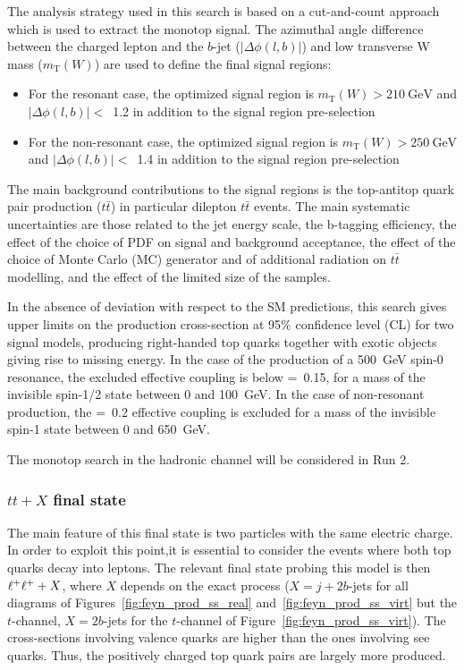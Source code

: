 The analysis strategy used in this search is based on a cut-and-count approach which is used to extract the 
monotop signal. The azimuthal angle difference between the charged lepton and the $b$-jet ($|\Delta \phi(l,b)|$) 
and low transverse W mass ($m_\mathrm{T}(W)$) are used to define the final signal regions: 
\begin{itemize}
  \item For the resonant case, the optimized signal region is $m_\mathrm{T}(W)>210\mathrm{~GeV}$ and $|\Delta \phi(l,b)|<$~1.2 in addition to the signal region pre-selection
  
  \item For the non-resonant case, the optimized signal region is $m_\mathrm{T}(W)>250\mathrm{~GeV}$ and $|\Delta \phi(l,b)|<$~1.4 in addition to the signal region pre-selection

\end{itemize}
The main background contributions to the signal regions is the top-antitop quark pair production ($t\bar{t}$)
in particular dilepton $t\bar{t}$ events.
The main systematic uncertainties are those related to the jet energy scale, the b-tagging efficiency, the effect of the choice of PDF on signal and background 
acceptance, the effect of the choice of Monte Carlo (MC) generator and of additional radiation on $t\bar{t}$ modelling, and the effect of the limited size of the samples.

In the absence of deviation with respect to the SM predictions,
this search gives upper limits on the production cross-section at 95\% confidence level (CL)
for two signal models, producing right-handed top quarks together with exotic objects
giving rise to missing energy.
In the case of the production of a 500~GeV spin-0 resonance, the excluded effective coupling is below \ares=~0.15,
for a mass of the invisible spin-1/2 state between 0 and 100~GeV.
In the case of non-resonant production, the \anonres=~0.2 effective coupling is excluded
for a mass of the invisible spin-1 state between 0 and 650~GeV. 

The monotop search in the hadronic channel will be considered in Run 2.

 \subsubsection{$tt+X$ final state}
 
 The main feature of this final state is two particles with the same electric charge. In order to exploit this point,it is essential to consider the events where both top quarks decay into leptons. 
 The relevant final state probing this model is then $\ell^{+}\ell^{+} + X$, where $X$ depends on the exact process ($X=j + 2b$-jets for all diagrams of 
 Figures~\ref{fig:feyn_prod_ss_real} and~\ref{fig:feyn_prod_ss_virt} but the $t$-channel, $X=2 b$-jets for the $t$-channel of Figure~\ref{fig:feyn_prod_ss_virt}).
 The cross-sections involving valence quarks are higher than the ones involving see quarks. Thus, the positively charged top quark pairs are largely more produced.

